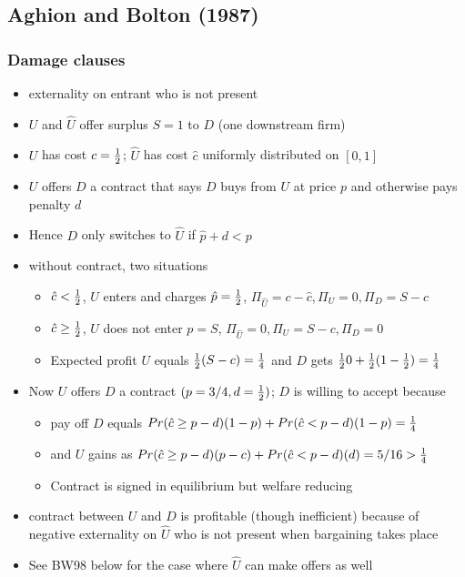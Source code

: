 \documentclass[11pt,english]{beamer}
\newcommand{\hf}{{\textstyle{1\over 2}}}
\newcommand{\kw}{{\textstyle{1\over 4}}}
\newcommand{\Uh}{\hat{U}}
\newcommand{\ch}{\hat{c}}
\begin{document}
\subsection{Aghion and Bolton (1987)}
\begin{frame}[allowframebreaks]\frametitle{Damage clauses}
  \begin{itemize}
  \item externality on entrant who is not present
  \item $U$ and $\Uh$ offer surplus $S=1$ to $D$ (one downstream firm)
  \item $U$ has cost $c=\hf$; $\Uh$ has cost $\ch$ uniformly
    distributed on $[0,1]$
  \item $U$ offers $D$ a contract that says $D$ buys from $U$ at price
    $p$ and otherwise pays penalty $d$
  \item Hence $D$ only switches to $\Uh$ if $\hat{p} + d<p$
  \item without contract, two situations
    \begin{itemize}
    \item $\ch < \hf$, $\Uh$ enters and charges $\hat{p} = \hf$,
      $\Pi_{\Uh} = c-\ch, \Pi_U=0, \Pi_D = S-c$
    \item $\ch \geq \hf$, $\Uh$ does not enter $p = S$, $\Pi_{\Uh} =0,
      \Pi_U=S-c, \Pi_D =0$
    \item Expected profit $U$ equals $\hf(S-c) = \kw$ and $D$ gets
      $\hf 0 + \hf (1-\hf) = \kw$
    \end{itemize}
  \item Now $U$ offers $D$ a contract $(p=3/4,d=\hf)$; $D$ is willing
    to accept because
    \begin{itemize}
    \item pay off $D$ equals $Pr(\ch \geq p-d)(1-p)+ Pr(\ch <
      p-d)(1-p) = \kw$
    \item and $U$ gains as $Pr(\ch \geq p-d)(p-c)+ Pr(\ch <
      p-d)(d)=5/16 > \kw$
    \item Contract is signed in equilibrium but welfare reducing
    \end{itemize}
  \item contract between $U$ and $D$ is profitable (though
    inefficient) because of negative externality on $\hat{U}$ who is
    not present when bargaining takes place
  \item See BW98 below for the case where $\hat{U}$ can make offers as
    well
  \end{itemize} %
\end{frame}
\end{document}
